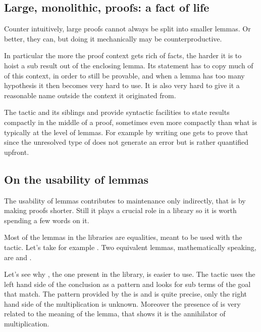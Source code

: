 \subsection{Large, monolithic, proofs: a fact of life}

Counter intuitively, large proofs cannot always be split into smaller
lemmas. Or better, they can, but doing it mechanically 
may be counterproductive.

In particular the more the proof context gets rich of facts, the harder it is
to hoist a sub result out of the enclosing lemma. Its statement has to
copy much of of this context, in order to still be provable,
and when a lemma has too many hypothesis it then becomes very hard to
use. It is also very hard to give it a reasonable name outside the
context it originated from.

The  tactic and its siblings  and 
provide syntactic facilities to state results
compactly in the middle of a proof, sometimes even more compactly than
what is typically at the level of lemmas. 
For example by writing  one
gets to prove that  since the unresolved
type of  does not generate an error but is rather quantified
upfront.

\subsection{On the usability of lemmas}

The usability of lemmas contributes to maintenance only indirectly,
that is by making proofs shorter. Still it plays a crucial role
in a library so it is worth spending a few words on it.

Most of the lemmas in the \mcbMC{} libraries are equalities, meant to be
used with the  tactic. Let's take for example . Two equivalent lemmas, mathematically speaking, are
and 
.

Let's see why , the one present in the library, is easier to use.
The  tactic uses the left hand side of the conclusion as
a pattern and looks for sub terms of the goal that match. 
The pattern
provided by the  is  and is quite precise, only the
right hand side of the multiplication is unknown. Moreover the presence of
 is very related to the meaning of the lemma, that shows it is
the annihilator of multiplication.

